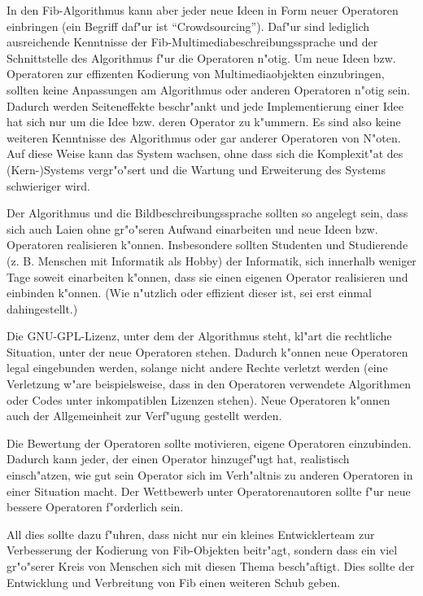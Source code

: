 In den Fib-Algorithmus kann aber jeder neue Ideen in Form neuer Operatoren einbringen (ein Begriff daf"ur ist ``Crowdsourcing''). Daf"ur sind lediglich ausreichende Kenntnisse der Fib-Multi\-media\-beschrei\-bungs\-sprache und der Schnittstelle des Algorithmus f"ur die Operatoren n"otig. Um neue Ideen bzw. Operatoren zur effizenten Kodierung von Multimediaobjekten einzubringen, sollten keine Anpassungen am Algorithmus oder anderen Operatoren n"otig sein. Dadurch werden Seiteneffekte beschr"ankt und jede Implementierung einer Idee hat sich nur um die Idee bzw. deren Operator zu k"ummern. Es sind also keine weiteren Kenntnisse des Algorithmus oder gar anderer Operatoren von N"oten. Auf diese Weise kann das System wachsen, ohne dass sich die Komplexit"at des (Kern-)Systems vergr"o"sert und die Wartung und Erweiterung des Systems schwieriger wird.

Der Algorithmus und die Bildbeschreibungssprache sollten so angelegt sein, dass sich auch Laien ohne gr"o"seren Aufwand einarbeiten und neue Ideen bzw. Operatoren realisieren k"onnen. Insbesondere sollten Studenten und Studierende (z. B. Menschen mit Informatik als Hobby) der Informatik, sich innerhalb weniger Tage soweit einarbeiten k"onnen, dass sie einen eigenen Operator realisieren und einbinden k"onnen. (Wie n"utzlich oder effizient dieser ist, sei erst einmal dahingestellt.)

Die GNU-GPL-Lizenz, unter dem der Algorithmus steht, kl"art die rechtliche Situation, unter der neue Operatoren stehen. Dadurch k"onnen neue Operatoren legal eingebunden werden, solange nicht andere Rechte verletzt werden (eine Verletzung w"are beispielsweise, dass in den Operatoren verwendete Algorithmen oder Codes unter inkompatiblen Lizenzen stehen). Neue Operatoren k"onnen auch der Allgemeinheit zur Verf"ugung gestellt werden.

Die Bewertung der Operatoren sollte motivieren, eigene Operatoren einzubinden. Dadurch kann jeder, der einen Operator hinzugef"ugt hat, realistisch einsch"atzen, wie gut sein Operator sich im Verh"altnis zu anderen Operatoren in einer Situation macht. Der Wettbewerb unter Operatorenautoren sollte f"ur neue bessere Operatoren f"orderlich sein.


All dies sollte dazu f"uhren, dass nicht nur ein kleines Entwicklerteam zur Verbesserung der Kodierung von Fib-Objekten beitr"agt, sondern dass ein viel gr"o"serer Kreis von Menschen sich mit diesen Thema besch"aftigt. Dies sollte der Entwicklung und Verbreitung von Fib einen weiteren Schub geben.

